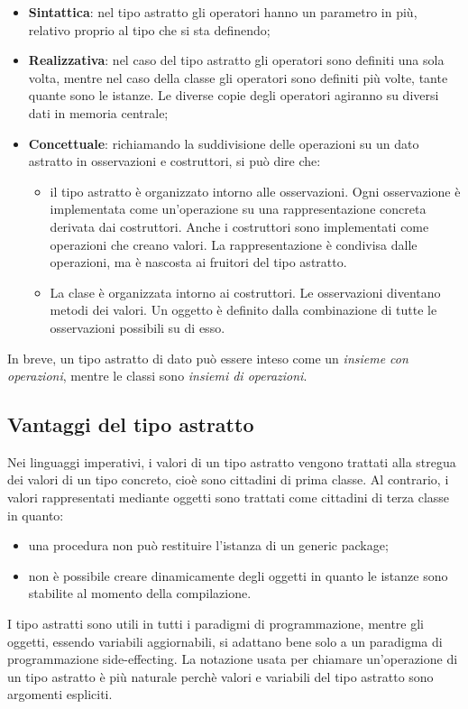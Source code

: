 \documentclass[12pt]{report}
\begin{document}
		\begin{itemize}
			\item \textbf{Sintattica}: nel tipo astratto gli operatori hanno un parametro in più, relativo proprio al tipo che si sta definendo;
			\item \textbf{Realizzativa}: nel caso del tipo astratto gli operatori sono definiti una sola volta, mentre nel caso della classe gli operatori sono definiti più volte, tante quante sono le istanze. Le diverse copie degli operatori agiranno su diversi dati in memoria centrale;
			\item \textbf{Concettuale}: richiamando la suddivisione delle operazioni su un dato astratto in osservazioni e costruttori, si può dire che:
			\begin{itemize}
				\item il tipo astratto è organizzato intorno alle osservazioni. Ogni osservazione è implementata come un'operazione su una rappresentazione concreta derivata dai costruttori. Anche i costruttori sono implementati come operazioni che creano valori. La rappresentazione è condivisa dalle operazioni, ma è nascosta ai fruitori del tipo astratto.
				\item La clase è organizzata intorno ai costruttori. Le osservazioni diventano metodi dei valori. Un oggetto è definito dalla combinazione di tutte le osservazioni possibili su di esso.
			\end{itemize}
		\end{itemize}
			In breve, un tipo astratto di dato può essere inteso come un \textit{insieme con operazioni}, mentre le classi sono \textit{insiemi di operazioni}.
			\subsection{Vantaggi del tipo astratto}
			Nei linguaggi imperativi, i valori di un tipo astratto vengono trattati alla stregua dei valori di un tipo concreto, cioè sono cittadini di prima classe. Al contrario, i valori rappresentati mediante oggetti sono trattati come cittadini di terza classe in quanto:
			\begin{itemize}
				\item una procedura non può restituire l'istanza di un generic package;
				\item non è possibile creare dinamicamente degli oggetti in quanto le istanze sono stabilite al momento della compilazione.
			\end{itemize}
			I tipo astratti sono utili in tutti i paradigmi di programmazione, mentre gli oggetti, essendo variabili aggiornabili, si adattano bene solo a un paradigma di programmazione side-effecting. La notazione usata per chiamare un'operazione di un tipo astratto è più naturale perchè valori e variabili del tipo astratto sono argomenti espliciti.
\end{document}
